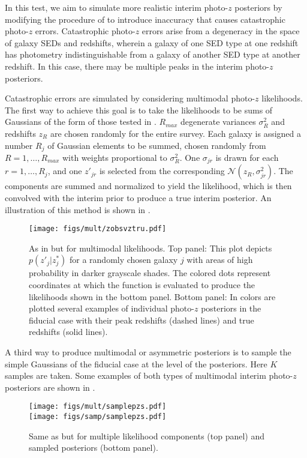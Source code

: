 In this test, we aim to simulate more realistic interim photo-$z$ posteriors by modifying the procedure of  to introduce inaccuracy that causes catastrophic photo-$z$ errors.  
Catastrophic photo-$z$ errors arise from a degeneracy in the space of galaxy SEDs and redshifts, wherein a galaxy of one SED type at one redshift has photometry indistinguishable from a galaxy of another SED type at another redshift.  
In this case, there may be multiple peaks in the interim photo-$z$ posteriors.  

Catastrophic errors are simulated by considering multimodal photo-$z$ likelihoods.  
The first way to achieve this goal is to take the likelihoods to be sums of Gaussians of the form of those tested in .  
$R_{max}$ degenerate variances $\sigma_{R}^{2} $ and redshifts $z_{R}$ are chosen randomly for the entire survey.  
Each galaxy is assigned a number $R_{j}$ of Gaussian elements to be summed, chosen randomly from $R=1,\dots,R_{max}$ with weights proportional to $\sigma_{R}^{2}$.  
One $\sigma_{jr}$ is drawn for each $r=1,\dots,R_{j}$, and one $z'_{jr}$ is selected from the corresponding $\mathcal{N}(z_{R},\sigma^{2}_{jr})$.  
The components are summed and normalized to yield the likelihood, which is then convolved with the interim prior to produce a true interim posterior.   
An illustration of this method is shown in . 

\begin{figure}
	\texttt{[image: figs/mult/zobsvztru.pdf]}
	\caption{As in  but for multimodal likelihoods.  
		Top panel: This plot depicts $p(z'_{j}|z^{*}_{j})$ for a randomly chosen galaxy $j$ with areas of high probability in darker grayscale shades.  
		The colored dots represent coordinates at which the function is evaluated to produce the likelihoods shown in the bottom panel.  
		Bottom panel: In colors are plotted several examples of individual photo-$z$ posteriors in the fiducial case with their peak redshifts (dashed lines) and true redshifts (solid lines).}
\end{figure}

A third way to produce multimodal or asymmetric posteriors is to sample the simple Gaussians of the fiducial case at the level of the posteriors.  
Here $K$ samples are taken.  
Some examples of both types of multimodal interim photo-$z$ posteriors are shown in .  

\begin{figure}
	\texttt{[image: figs/mult/samplepzs.pdf]}\\
	\texttt{[image: figs/samp/samplepzs.pdf]}
	\caption{Same as  but for multiple likelihood components (top panel) and sampled posteriors (bottom panel).}
\end{figure}

